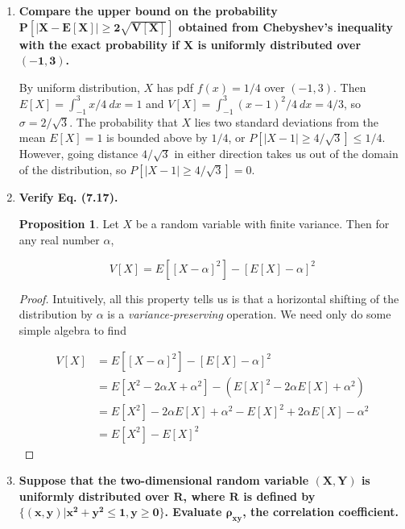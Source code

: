 \documentclass[10pt, oneside]{article}   	%
\theoremstyle{definition}
\newtheorem*{prop*}{Proposition}
\begin{document}
\begin{enumerate}[label=7.\arabic*]
\item  \begin{tcolorbox}[
  colback=Cerulean!5!white,
  colframe=Cerulean!75!black]
  \textbf{Compare the upper bound on the probability $\bm{P[|X - E[X]| \geq 2 \sqrt{V[X]}]}$ obtained from Chebyshev's inequality with the exact probability if $\bm{X}$ is uniformly distributed over $\bm{(-1,3)}$.}
  \end{tcolorbox}
  
  By uniform distribution, $X$ has pdf $f(x) = 1/4$ over $(-1,3)$. Then $E[X] = \int^3_{-1} x/4 \ dx = 1$ and $V[X] = \int^3_{-1} (x-1)^2 / 4 \ dx = 4/3$, so $\sigma = 2 / \sqrt{3}$. The probability that $X$ lies two standard deviations from the mean $E[X] = 1$ is bounded above by $1/4$, or $P[|X - 1| \geq 4 / \sqrt{3}] \leq 1/4$. However, going distance $4/\sqrt{3}$ in either direction takes us out of the domain of the distribution, so $\boxed{P[|X - 1| \geq 4 / \sqrt{3}] = 0}$.
  
\item  \begin{tcolorbox}[
  colback=Cerulean!5!white,
  colframe=Cerulean!75!black]
  \textbf{Verify Eq. (7.17).}
  \end{tcolorbox}
  
  \begin{prop*}
  Let $X$ be a random variable with finite variance. Then for any real number $\alpha$,
  
  \[ V[X] = E[[X - \alpha]^2] - [E[X] - \alpha]^2 \]
  \end{prop*}
  
  \begin{proof}
  Intuitively, all this property tells us is that a horizontal shifting of the distribution by $\alpha$ is a \textit{variance-preserving} operation. We need only do some simple algebra to find
  
  \begin{align*}
  V[X] &= E[[X - \alpha]^2] - [E[X] - \alpha]^2 \\
  &= E[X^2 - 2\alpha X + \alpha^2] - (E[X]^2 - 2\alpha E[X] + \alpha^2) \\
  &= E[X^2] - 2\alpha E[X] + \alpha^2 - E[X]^2 + 2\alpha E[X] - \alpha^2 \\
  &= \boxed{E[X^2] - E[X]^2}
  \end{align*}
  \end{proof}
  
\item  \begin{tcolorbox}[
  colback=Cerulean!5!white,
  colframe=Cerulean!75!black]
  \textbf{Suppose that the two-dimensional random variable $\bm{(X,Y)}$ is uniformly distributed over $\bm{R}$, where $\bm{R}$ is defined by $\bm{ \{ (x,y) | x^2 + y^2 \leq 1, y \geq 0 \} }$. Evaluate $\bm{\rho_{xy}}$, the correlation coefficient.}
  \end{tcolorbox}
  

\end{enumerate}
\end{document}
